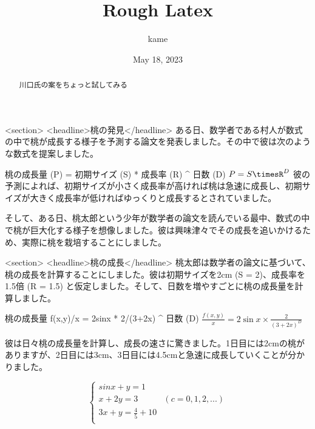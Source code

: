 \documentclass[titlepage]{jsarticle}
\title{Rough Latex}
\author{kame}
\date{May 18, 2023}
\begin{document}
\maketitle

\begin{abstract}川口氏の案をちょっと試してみる\end{abstract}
<section>
<headline>桃の発見</headline>
ある日、数学者である村人が数式の中で桃が成長する様子を予測する論文を発表しました。その中で彼は次のような数式を提案しました。

桃の成長量 (P) = 初期サイズ (S) * 成長率 (R) ^ 日数 (D)
$P=S\timesR^D$
彼の予測によれば、初期サイズが小さく成長率が高ければ桃は急速に成長し、初期サイズが大きく成長率が低ければゆっくりと成長するとされていました。

そして、ある日、桃太郎という少年が数学者の論文を読んでいる最中、数式の中で桃が巨大化する様子を想像しました。彼は興味津々でその成長を追いかけるため、実際に桃を栽培することにしました。

<section>
<headline>桃の成長</headline>
桃太郎は数学者の論文に基づいて、桃の成長を計算することにしました。彼は初期サイズを2cm (S = 2)、成長率を1.5倍 (R = 1.5) と仮定しました。そして、日数を増やすごとに桃の成長量を計算しました。

桃の成長量 f(x,y)/x  = 2sinx * 2/(3+2x) ^ {日数 (D)}
$\frac{f(x,y)}{x}=2 \sin x\times\frac{2}{(3\plus2x)^D}$

彼は日々桃の成長量を計算し、成長の速さに驚きました。1日目には2cmの桃がありますが、2日目には3cm、3日目には4.5cmと急速に成長していくことが分かりました。


\[
\left\{
\begin{array}{ll}
sin x + y = 1 \\
x + 2y = 3 & (c = 0, 1, 2, ...)  \\
3x + y = \frac{4}{5} + 10 \\
\end{array}
\right.
\]
\end{document}
